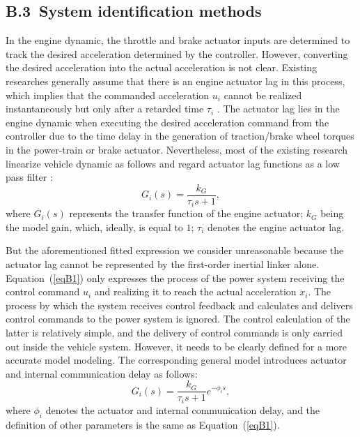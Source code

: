 \documentclass[a4paper]{cas-sc}
\begin{document}
\subsection*{B.3~System identification methods}
\label{Section B.3}

In the engine dynamic, the throttle and brake actuator inputs are determined to track the desired acceleration determined by the controller.
However, converting the desired acceleration into the actual acceleration is not clear. Existing researches generally assume that there is an engine actuator lag in this process, which implies that the commanded acceleration $u_i$ cannot be realized instantaneously but only after a retarded time $\tau_i$ \citep{Mak2011}. The actuator lag lies in the engine dynamic when executing the desired acceleration command from the controller due to the time delay in the generation of traction/brake wheel torques in the power-train or brake actuator. Nevertheless, most of the existing research linearize vehicle dynamic as follows and regard actuator lag functions as a low pass filter \citep{Wang2018e,Naus2010a}:
\begin{equation}
  G_i(s)=\frac{k_G}{\tau_is+1},
  \label{eqB1}
\end{equation}
where $G_i(s)$ represents the transfer function of the engine actuator; $k_G$ being the model gain, which, ideally, is equal to $1$; $\tau_i$ denotes the engine actuator lag.

But the aforementioned fitted expression we consider unreasonable because the actuator lag cannot be represented by the first-order inertial linker alone. Equation~(\ref{eqB1}) only expresses the process of the power system receiving the control command $u_i$ and realizing it to reach the actual acceleration ${\ddot{x}}_i$. The process by which the system receives control feedback and calculates and delivers control commands to the power system is ignored. The control calculation of the latter is relatively simple, and the delivery of control commands is only carried out inside the vehicle system. However, it needs to be clearly defined for a more accurate model modeling. The corresponding general model introduces actuator and internal communication delay as follows:
\begin{equation}
  G_i(s)=\frac{k_G}{\tau_is+1}e^{-\phi_is},
  \label{eqB2}
\end{equation}
where $\phi_i$ denotes the actuator and internal communication delay, and the definition of other parameters is the same as Equation~(\ref{eqB1}).
\end{document}
